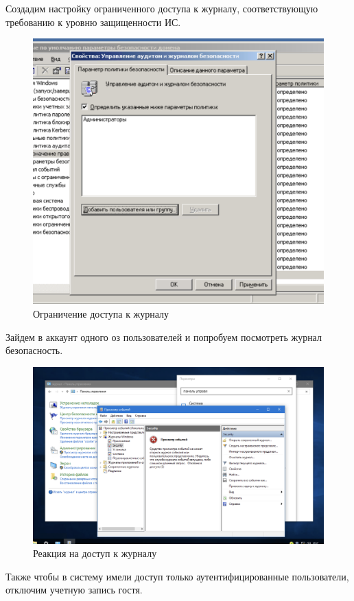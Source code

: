 Создадим настройку ограниченного доступа к журналу, соответствующую требованию к уровню защищенности ИС.
\begin{figure}[H]
  \centering
  \includegraphics[width=1\textwidth]{pict/prac/59}
  \caption{Ограничение доступа к журналу}
\end{figure}

Зайдем в аккаунт одного оз пользователей и попробуем посмотреть журнал безопасность.
\begin{figure}[H]
  \centering
  \includegraphics[width=1\textwidth]{pict/prac/80}
  \caption{Реакция на доступ к журналу}
\end{figure}

Также чтобы в систему имели доступ только аутентифицированные пользователи, отключим учетную запись гостя.

